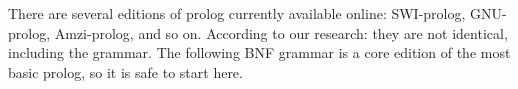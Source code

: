 There are several editions of prolog currently available online: SWI-prolog\cite{swi}, GNU-prolog\cite{gprolog}, Amzi-prolog\cite{amzi}, and so on. According to our research: they are not identical, including the grammar. The following BNF grammar is a core edition\cite{prologBNF} of the most basic prolog, so it is safe to start here.
